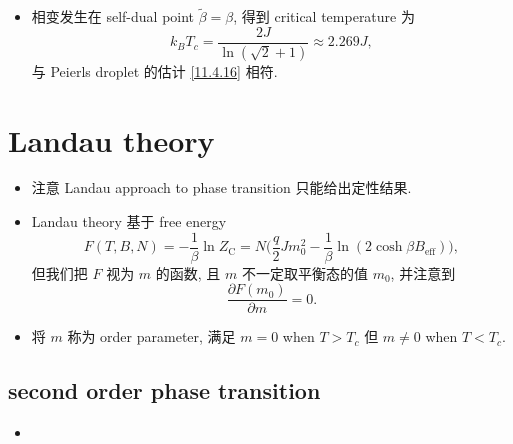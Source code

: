 \begin{itemize}
	\item 相变发生在 self-dual point $\tilde{\beta} = \beta$, 得到 critical temperature 为
	\begin{equation}
		k_B T_c = \frac{2 J}{\ln(\sqrt{2} + 1)} \approx 2.269 J,
	\end{equation}
	与 Peierls droplet 的估计 \eqref{11.4.16} 相符.
\end{itemize}

\section{Landau theory}
\begin{itemize}
	\item 注意 Landau approach to phase transition 只能给出定性结果.
	
	\item Landau theory 基于 free energy
	\begin{equation}
		F(T, B, N) = - \frac{1}{\beta} \ln Z_\text{C} = N \Big( \frac{q}{2} J m_0^2 - \frac{1}{\beta} \ln(2 \cosh \beta B_\text{eff}) \Big),
	\end{equation}
	但我们把 $F$ 视为 $m$ 的函数, 且 $m$ 不一定取平衡态的值 $m_0$, 并注意到
	\begin{equation}
		\frac{\partial F(m_0)}{\partial m} = 0.
	\end{equation}
	
	\item 将 $m$ 称为 order parameter, 满足 $m = 0$ when $T > T_c$ 但 $m \neq 0$ when $T < T_c$.
\end{itemize}

\subsection{second order phase transition}
\begin{itemize}
	\item 
\end{itemize}
